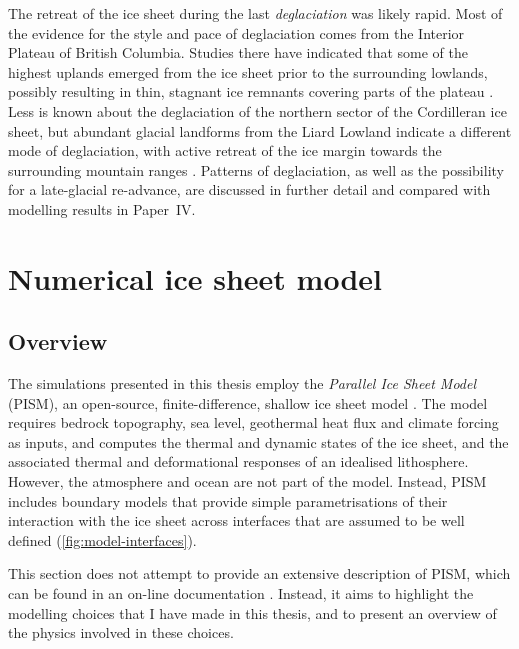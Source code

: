 \documentclass[a4paper]{kappa}
\newcommand{\CCYC}[0]{Paper~IV}     %
\begin{document}
The retreat of the ice sheet during the last \emph{deglaciation} was likely
rapid. Most of the evidence for the style and pace of deglaciation comes from
the Interior Plateau of British Columbia. Studies there have indicated that
some of the highest
uplands emerged from the ice sheet prior to the surrounding lowlands, possibly
resulting in thin, stagnant ice remnants covering parts of the plateau
\citep{Fulton.1967, Fulton.1991, Margold.etal.2011, Margold.etal.2013a}. Less
is known about the deglaciation of the northern sector of the Cordilleran ice
sheet, but abundant glacial landforms from the Liard Lowland indicate a
different mode of deglaciation, with active retreat of the ice margin towards
the surrounding mountain ranges \citep{Margold.etal.2013}. Patterns of
deglaciation, as well as the possibility for a late-glacial re-advance, are
discussed in further detail and compared with modelling results in
\CCYC.

\section{Numerical ice sheet model}

\subsection{Overview}

The simulations presented in this thesis employ the \emph{Parallel Ice Sheet
Model} (PISM), an open-source, finite-difference, shallow ice sheet model
\citep{PISM-authors.2014}. The model requires bedrock topography, sea level,
geothermal heat flux and climate forcing as inputs, and computes the thermal
and dynamic states of the ice sheet, and the associated thermal and
deformational responses of an idealised lithosphere. However, the atmosphere
and ocean are not part of the model. Instead, PISM includes boundary models
that provide simple parametrisations of their interaction with the ice sheet
across interfaces that are assumed to be well defined
(\cref{fig:model-interfaces}).

This section does not attempt to provide an extensive description of PISM,
which can be found in an on-line documentation
\citep[\url{http://www.pism-docs.org},][]{PISM-authors.2014}.
Instead, it aims to highlight the modelling choices that I have made in this
thesis, and to present an overview of the physics involved in these choices.
\end{document}
